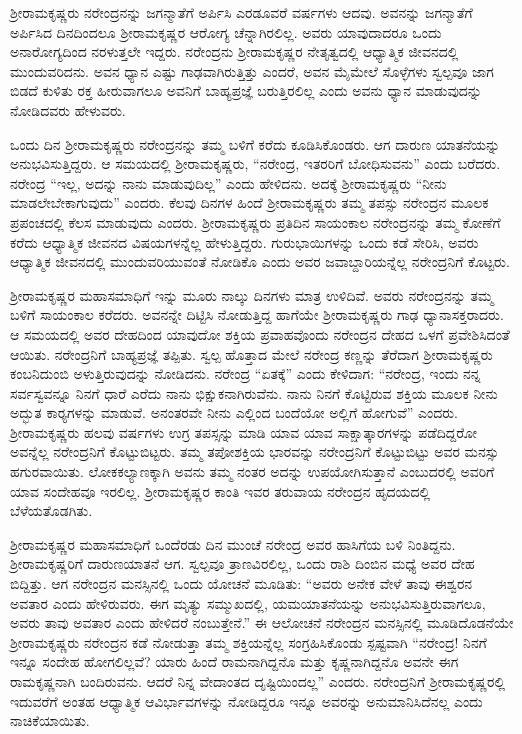 ಶ‍್ರೀರಾಮಕೃಷ್ಣರು ನರೇಂದ್ರನನ್ನು ಜಗನ್ಮಾತೆಗೆ ಅರ್ಪಿಸಿ ಎರಡೂವರೆ ವರ್ಷಗಳು ಆದವು. ಅವನನ್ನು ಜಗನ್ಮಾತೆಗೆ ಅರ್ಪಿಸಿದ ದಿನದಿಂದಲೂ ಶ‍್ರೀರಾಮಕೃಷ್ಣರ ಆರೋಗ್ಯ ಚೆನ್ನಾಗಿರಲಿಲ್ಲ. ಅವರು ಯಾವುದಾದರೂ ಒಂದು ಅನಾರೋಗ್ಯದಿಂದ ನರಳುತ್ತಲೇ ಇದ್ದರು. ನರೇಂದ್ರನು ಶ‍್ರೀರಾಮಕೃಷ್ಣರ ನೇತೃತ್ವದಲ್ಲಿ ಆಧ್ಯಾತ್ಮಿಕ ಜೀವನದಲ್ಲಿ ಮುಂದುವರಿದನು. ಅವನ ಧ್ಯಾನ ಎಷ್ಟು ಗಾಢವಾಗಿರುತ್ತಿತ್ತು ಎಂದರೆ, ಅವನ ಮೈಮೇಲೆ ಸೊಳ್ಳೆಗಳು ಸ್ವಲ್ಪವೂ ಜಾಗ ಬಿಡದೆ ಕುಳಿತು ರಕ್ತ ಹೀರುವಾಗಲೂ ಅವನಿಗೆ ಬಾಹ್ಯಪ್ರಜ್ಞೆ ಬರುತ್ತಿರಲಿಲ್ಲ ಎಂದು ಅವನು ಧ್ಯಾನ ಮಾಡುವುದನ್ನು ನೋಡಿದವರು ಹೇಳುವರು.

ಒಂದು ದಿನ ಶ‍್ರೀರಾಮಕೃಷ್ಣರು ನರೇಂದ್ರನನ್ನು ತಮ್ಮ ಬಳಿಗೆ ಕರೆದು ಕೂಡಿಸಿಕೊಂಡರು. ಆಗ ದಾರುಣ ಯಾತನೆಯನ್ನು ಅನುಭವಿಸುತ್ತಿದ್ದರು. ಆ ಸಮಯದಲ್ಲಿ ಶ‍್ರೀರಾಮಕೃಷ್ಣರು, “ನರೇಂದ್ರ, ಇತರರಿಗೆ ಬೋಧಿಸುವನು” ಎಂದು ಬರೆದರು. ನರೇಂದ್ರ “ಇಲ್ಲ, ಅದನ್ನು ನಾನು ಮಾಡುವುದಿಲ್ಲ” ಎಂದು ಹೇಳಿದನು. ಅದಕ್ಕೆ ಶ‍್ರೀರಾಮಕೃಷ್ಣರು “ನೀನು ಮಾಡಲೇಬೇಕಾಗುವುದು” ಎಂದರು. ಕೆಲವು ದಿನಗಳ ಹಿಂದೆ ಶ‍್ರೀರಾಮಕೃಷ್ಣರು ತಮ್ಮ ತಪಸ್ಸು ನರೇಂದ್ರನ ಮೂಲಕ ಪ್ರಪಂಚದಲ್ಲಿ ಕೆಲಸ ಮಾಡುವುದು ಎಂದರು. ಶ‍್ರೀರಾಮಕೃಷ್ಣರು ಪ್ರತಿದಿನ ಸಾಯಂಕಾಲ ನರೇಂದ್ರನನ್ನು ತಮ್ಮ ಕೋಣೆಗೆ ಕರೆದು ಆಧ್ಯಾತ್ಮಿಕ ಜೀವನದ ವಿಷಯಗಳನ್ನೆಲ್ಲ ಹೇಳುತ್ತಿದ್ದರು. ಗುರುಭಾಯಿಗಳನ್ನು ಒಂದು ಕಡೆ ಸೇರಿಸಿ, ಅವರು ಆಧ್ಯಾತ್ಮಿಕ ಜೀವನದಲ್ಲಿ ಮುಂದುವರಿಯುವಂತೆ ನೋಡಿಕೊ ಎಂದು ಅವರ ಜವಾಬ್ದಾರಿಯನ್ನೆಲ್ಲ ನರೇಂದ್ರನಿಗೆ ಕೊಟ್ಟರು.

ಶ‍್ರೀರಾಮಕೃಷ್ಣರ ಮಹಾಸಮಾಧಿಗೆ ಇನ್ನು ಮೂರು ನಾಲ್ಕು ದಿನಗಳು ಮಾತ್ರ ಉಳಿದಿವೆ. ಅವರು ನರೇಂದ್ರನನ್ನು ತಮ್ಮ ಬಳಿಗೆ ಸಾಯಂಕಾಲ ಕರೆದರು. ಅವನನ್ನೇ ದಿಟ್ಟಿಸಿ ನೋಡುತ್ತಿದ್ದ ಹಾಗೆಯೇ ಶ‍್ರೀರಾಮಕೃಷ್ಣರು ಗಾಢ ಧ್ಯಾನಾಸಕ್ತರಾದರು. ಆ ಸಮಯದಲ್ಲಿ ಅವರ ದೇಹದಿಂದ ಯಾವುದೋ ಶಕ್ತಿಯ ಪ್ರವಾಹವೊಂದು ನರೇಂದ್ರನ ದೇಹದ ಒಳಗೆ ಪ್ರವೇಶಿಸಿದಂತೆ ಆಯಿತು. ನರೇಂದ್ರನಿಗೆ ಬಾಹ್ಯಪ್ರಜ್ಞೆ ತಪ್ಪಿತು. ಸ್ವಲ್ಪ ಹೊತ್ತಾದ ಮೇಲೆ ನರೇಂದ್ರ ಕಣ್ಣನ್ನು ತೆರೆದಾಗ ಶ‍್ರೀರಾಮಕೃಷ್ಣರು ಕಂಬನಿದುಂಬಿ ಅಳುತ್ತಿರುವುದನ್ನು ನೋಡಿದನು. ನರೇಂದ್ರ “ಏತಕ್ಕೆ” ಎಂದು ಕೇಳಿದಾಗ: “ನರೇಂದ್ರ, ಇಂದು ನನ್ನ ಸರ್ವಸ್ವವನ್ನೂ ನಿನಗೆ ಧಾರೆ ಎರೆದು ನಾನು ಭಿಕ್ಷುಕನಾಗಿರುವೆನು. ನಾನು ನಿನಗೆ ಕೊಟ್ಟಿರುವ ಶಕ್ತಿಯ ಮೂಲಕ ನೀನು ಅದ್ಭುತ ಕಾರ‍್ಯಗಳನ್ನು ಮಾಡುವೆ. ಅನಂತರವೇ ನೀನು ಎಲ್ಲಿಂದ ಬಂದೆಯೋ ಅಲ್ಲಿಗೆ ಹೋಗುವೆ” ಎಂದರು. ಶ‍್ರೀರಾಮಕೃಷ್ಣರು ಹಲವು ವರ್ಷಗಳು ಉಗ್ರ ತಪಸ್ಸನ್ನು ಮಾಡಿ ಯಾವ ಯಾವ ಸಾಕ್ಷಾತ್ಕಾರಗಳನ್ನು ಪಡೆದಿದ್ದರೋ ಅವನ್ನೆಲ್ಲ ನರೇಂದ್ರನಿಗೆ ಕೊಟ್ಟುಬಿಟ್ಟರು. ತಮ್ಮ ತಪೋಶಕ್ತಿಯ ಭಾರವನ್ನು ನರೇಂದ್ರನಿಗೆ ಕೊಟ್ಟುಬಿಟ್ಟು ಅವರ ಮನಸ್ಸು ಹಗುರವಾಯಿತು. ಲೋಕಕಲ್ಯಾಣಕ್ಕಾಗಿ ಅವನು ತಮ್ಮ ನಂತರ ಅದನ್ನು ಉಪಯೋಗಿಸುತ್ತಾನೆ ಎಂಬುದರಲ್ಲಿ ಅವರಿಗೆ ಯಾವ ಸಂದೇಹವೂ ಇರಲಿಲ್ಲ. ಶ‍್ರೀರಾಮಕೃಷ್ಣರ ಕಾಂತಿ ಇವರ ತರುವಾಯ ನರೇಂದ್ರನ ಹೃದಯದಲ್ಲಿ ಬೆಳೆಯತೊಡಗಿತು.

ಶ‍್ರೀರಾಮಕೃಷ್ಣರ ಮಹಾಸಮಾಧಿಗೆ ಒಂದೆರಡು ದಿನ ಮುಂಚೆ ನರೇಂದ್ರ ಅವರ ಹಾಸಿಗೆಯ ಬಳಿ ನಿಂತಿದ್ದನು. ಶ‍್ರೀರಾಮಕೃಷ್ಣರಿಗೆ ದಾರುಣಯಾತನೆ ಆಗ. ಸ್ವಲ್ಪವೂ ತ್ರಾಣವಿರಲಿಲ್ಲ, ಒಂದು ರಾಶಿ ದಿಂಬಿನ ಮಧ್ಯೆ ಅವರ ದೇಹ ಬಿದ್ದಿತ್ತು. ಆಗ ನರೇಂದ್ರನ ಮನಸ್ಸಿನಲ್ಲಿ ಒಂದು ಯೋಚನೆ ಮೂಡಿತು: “ಅವರು ಅನೇಕ ವೇಳೆ ತಾವು ಈಶ್ವರನ ಅವತಾರ ಎಂದು ಹೇಳಿರುವರು. ಈಗ ಮೃತ್ಯು ಸಮ್ಮುಖದಲ್ಲಿ, ಯಮಯಾತನೆಯನ್ನು ಅನುಭವಿಸುತ್ತಿರುವಾಗಲೂ, ಅವರು ತಾವು ಅವತಾರ ಎಂದು ಹೇಳಿದರೆ ನಂಬುತ್ತೇನೆ.” ಈ ಆಲೋಚನೆ ನರೇಂದ್ರನ ಮನಸ್ಸಿನಲ್ಲಿ ಮೂಡಿದೊಡನೆಯೇ ಶ‍್ರೀರಾಮಕೃಷ್ಣರು ನರೇಂದ್ರನ ಕಡೆ ನೋಡುತ್ತಾ ತಮ್ಮ ಶಕ್ತಿಯನ್ನೆಲ್ಲ ಸಂಗ್ರಹಿಸಿಕೊಂಡು ಸ್ಪಷ್ಟವಾಗಿ “ನರೇಂದ್ರ! ನಿನಗೆ ಇನ್ನೂ ಸಂದೇಹ ಹೋಗಲಿಲ್ಲವೆ? ಯಾರು ಹಿಂದೆ ರಾಮನಾಗಿದ್ದನೊ ಮತ್ತು ಕೃಷ್ಣನಾಗಿದ್ದನೊ ಅವನೇ ಈಗ ರಾಮಕೃಷ್ಣನಾಗಿ ಬಂದಿರುವನು. ಆದರೆ ನಿನ್ನ ವೇದಾಂತದ ದೃಷ್ಟಿಯಿಂದಲ್ಲ” ಎಂದರು. ನರೇಂದ್ರನಿಗೆ ಶ‍್ರೀರಾಮಕೃಷ್ಣರಲ್ಲಿ ಇದುವರೆಗೆ ಅಂತಹ ಆಧ್ಯಾತ್ಮಿಕ ಆವಿರ್ಭಾವಗಳನ್ನು ನೋಡಿದ್ದರೂ ಇನ್ನೂ ಅವರನ್ನು ಅನುಮಾನಿಸಿದೆನಲ್ಲ ಎಂದು ನಾಚಿಕೆಯಾಯಿತು.


